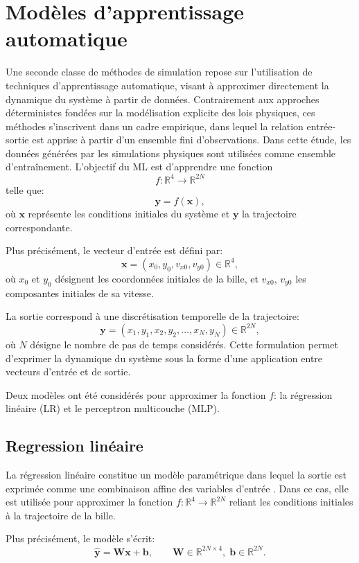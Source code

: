 \documentclass[
	a4paper, %
	10pt, %
	unnumberedsections, %
	twoside, %
]{LTJournalArticle}
\begin{document}
\section{Modèles d'apprentissage automatique}

Une seconde classe de méthodes de simulation repose sur l’utilisation de
techniques d’apprentissage automatique, visant à approximer directement la
dynamique du système à partir de données. Contrairement aux approches
déterministes fondées sur la modélisation explicite des lois physiques, ces
méthodes s’inscrivent dans un cadre empirique, dans lequel la relation
entrée-sortie est apprise à partir d’un ensemble fini d’observations. Dans
cette étude, les données générées par les simulations physiques sont utilisées
comme ensemble d’entraînement. L’objectif du ML est d’apprendre une fonction
\[
    f: \mathbb{R}^4 \rightarrow \mathbb{R}^{2N}
\]
telle que:
\[
    \mathbf{y} = f(\mathbf{x}),
\]
où \( \mathbf{x} \) représente les conditions initiales du système et \(
\mathbf{y} \) la trajectoire correspondante.

Plus précisément, le vecteur d’entrée est défini par:
\[
    \mathbf{x} = (x_0, y_0, v_{x0}, v_{y0}) \in \mathbb{R}^4,
\]
où \( x_0 \) et \( y_0 \) désignent les coordonnées initiales de la bille, et
\( v_{x0} \), \( v_{y0} \) les composantes initiales de sa vitesse.

La sortie correspond à une discrétisation temporelle de la trajectoire:
\[
    \mathbf{y} = (x_1, y_1, x_2, y_2, \dots, x_N, y_N) \in \mathbb{R}^{2N},
\]
où \( N \) désigne le nombre de pas de temps considérés. Cette formulation
permet d’exprimer la dynamique du système sous la forme d’une application entre
vecteurs d’entrée et de sortie.

Deux modèles ont été considérés pour approximer la fonction \( f \): la
régression linéaire (LR) et le perceptron multicouche (MLP).

\subsection{Regression linéaire}

La régression linéaire constitue un modèle paramétrique dans lequel la sortie
est exprimée comme une combinaison affine des variables d’entrée
\cite{ULB:INFOF422_Practical03}. Dans ce cas, elle est utilisée pour
approximer la fonction \( f : \mathbb{R}^4 \rightarrow \mathbb{R}^{2N} \)
reliant les conditions initiales à la trajectoire de la bille.

Plus précisément, le modèle s’écrit:
\[
    \hat{\mathbf{y}} = \mathbf{W}\mathbf{x} + \mathbf{b}, \qquad
    \mathbf{W} \in \mathbb{R}^{2N \times 4},\; \mathbf{b} \in \mathbb{R}^{2N}.
\]
\end{document}
